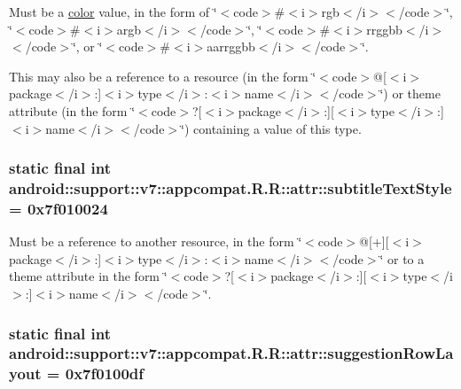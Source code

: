 Must be a \hyperlink{classandroid_1_1support_1_1v7_1_1appcompat_1_1_r_1_1color}{color} value, in the form of \char`\"{}$<$code$>$\#$<$i$>$rgb$<$/i$>$$<$/code$>$\char`\"{}, \char`\"{}$<$code$>$\#$<$i$>$argb$<$/i$>$$<$/code$>$\char`\"{}, \char`\"{}$<$code$>$\#$<$i$>$rrggbb$<$/i$>$$<$/code$>$\char`\"{}, or \char`\"{}$<$code$>$\#$<$i$>$aarrggbb$<$/i$>$$<$/code$>$\char`\"{}. 

This may also be a reference to a resource (in the form \char`\"{}$<$code$>$@\mbox{[}$<$i$>$package$<$/i$>$:\mbox{]}$<$i$>$type$<$/i$>$:$<$i$>$name$<$/i$>$$<$/code$>$\char`\"{}) or theme attribute (in the form \char`\"{}$<$code$>$?\mbox{[}$<$i$>$package$<$/i$>$:\mbox{]}\mbox{[}$<$i$>$type$<$/i$>$:\mbox{]}$<$i$>$name$<$/i$>$$<$/code$>$\char`\"{}) containing a value of this type. \hypertarget{classandroid_1_1support_1_1v7_1_1appcompat_1_1_r_1_1attr_3c014ba5d5b04ee8b7427073ad5bb7a5}{
\subsubsection[{subtitleTextStyle}]{\setlength{\rightskip}{0pt plus 5cm}static final int android::support::v7::appcompat.R.R::attr::subtitleTextStyle = 0x7f010024}}
\label{classandroid_1_1support_1_1v7_1_1appcompat_1_1_r_1_1attr_3c014ba5d5b04ee8b7427073ad5bb7a5}


Must be a reference to another resource, in the form \char`\"{}$<$code$>$@\mbox{[}+\mbox{]}\mbox{[}$<$i$>$package$<$/i$>$:\mbox{]}$<$i$>$type$<$/i$>$:$<$i$>$name$<$/i$>$$<$/code$>$\char`\"{} or to a theme attribute in the form \char`\"{}$<$code$>$?\mbox{[}$<$i$>$package$<$/i$>$:\mbox{]}\mbox{[}$<$i$>$type$<$/i$>$:\mbox{]}$<$i$>$name$<$/i$>$$<$/code$>$\char`\"{}. \hypertarget{classandroid_1_1support_1_1v7_1_1appcompat_1_1_r_1_1attr_0ff0f12ae8b6b4d9a0b895c3b6b870ef}{
\subsubsection[{suggestionRowLayout}]{\setlength{\rightskip}{0pt plus 5cm}static final int android::support::v7::appcompat.R.R::attr::suggestionRowLayout = 0x7f0100df}}
\label{classandroid_1_1support_1_1v7_1_1appcompat_1_1_r_1_1attr_0ff0f12ae8b6b4d9a0b895c3b6b870ef}


